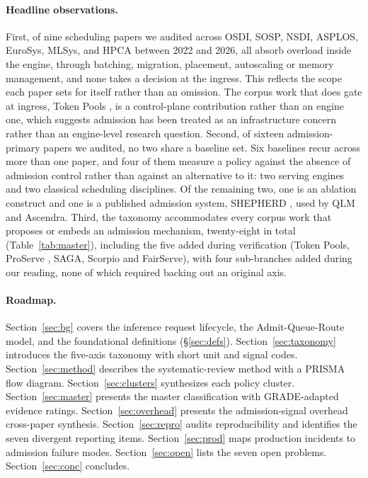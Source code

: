 \paragraph{Headline observations.} First, of nine scheduling papers
we audited across OSDI, SOSP, NSDI, ASPLOS, EuroSys, MLSys, and HPCA
between 2022 and 2026, all absorb overload inside the engine, through
batching, migration, placement, autoscaling or memory management, and
none takes a decision at the ingress. This reflects the scope each
paper sets for itself rather than an omission. The corpus work that
does gate at ingress, Token Pools
\citep{cunningham2026tokenpools}, is a control-plane contribution
rather than an engine one, which suggests admission has been treated as
an infrastructure concern rather than an engine-level research
question. Second, of sixteen admission-primary papers we
audited, no two share a baseline set. Six baselines recur across more
than one paper, and four of them measure a policy against the absence
of admission control rather than against an alternative to it: two
serving engines and two classical scheduling disciplines. Of the
remaining two, one is an ablation construct and one is a published
admission system, SHEPHERD \citep{shepherd2023}, used by QLM and
Ascendra. Third, the taxonomy accommodates every corpus work that proposes or
embeds an admission mechanism, twenty-eight in total
(Table~\ref{tab:master}), including the five added during verification
(Token Pools, ProServe \citep{huang2025proserve}, SAGA, Scorpio and FairServe), with four
sub-branches added during our reading, none of which required
backing out an original axis.

\paragraph{Roadmap.} Section~\ref{sec:bg} covers the inference request
lifecycle, the Admit-Queue-Route model, and the foundational
definitions (\S\ref{sec:defs}). Section~\ref{sec:taxonomy} introduces
the five-axis taxonomy with short unit and signal codes.
Section~\ref{sec:method} describes the systematic-review method with a
PRISMA flow diagram. Section~\ref{sec:clusters} synthesizes each
policy cluster. Section~\ref{sec:master} presents the master
classification with GRADE-adapted evidence ratings.
Section~\ref{sec:overhead} presents the admission-signal overhead
cross-paper synthesis. Section~\ref{sec:repro} audits reproducibility
and identifies the seven divergent reporting items. Section~\ref{sec:prod} maps
production incidents to admission failure modes.
Section~\ref{sec:open} lists the seven open problems.
Section~\ref{sec:conc} concludes.


